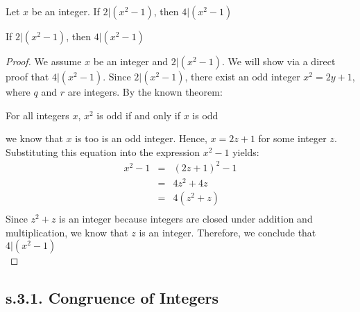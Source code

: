 \begin{example}
Let $x$ be an integer. If $2 | (x^2 - 1)$, then $4 | (x^2 - 1)$ \\

\begin{tcolorbox}
	\begin{theorem}
		If $2 | (x^2 - 1)$, then $4 | (x^2 - 1)$
	\end{theorem}
\end{tcolorbox}

\begin{proof}
We assume $x$ be an integer and $2 | (x^2 - 1)$. We will show via a direct proof that $4 | (x^2 - 1)$. Since $2 | (x^2 - 1)$, there exist an odd integer $x^2 = 2y + 1$, where $q$ and $r$ are integers. By the known theorem: 
	\begin{theorem}
	\label{oddsquaretheory}		
		For all integers $x$, $x^2$ is odd if and only if $x$ is odd
	\end{theorem}
we know that $x$ is too is an odd integer. Hence, $x = 2z + 1$ for some integer $z$. Substituting this equation into the expression $x^2 - 1$ yields:
\begin{eqnarray*}
	x^2 - 1 & = & (2z + 1)^2 - 1 \nonumber \\	
	& = & 4z^2 + 4z \nonumber \\	
	& = & 4(z^2 + z) \nonumber \\	
\end{eqnarray*}
Since $z^2 + z$ is an integer because integers are closed under addition  and multiplication, we know that $z$ is an integer. Therefore, we conclude that $4 | (x^2 - 1)$ \\
\end{proof}
\end{example}

\newpage
\subsection{s.3.1. Congruence of Integers}

